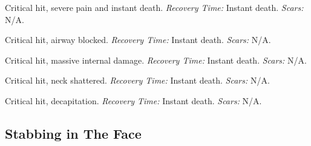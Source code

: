 \documentclass[12pt]{book}  %
\begin{document}
\begin{description}[labelwidth=1.5em, leftmargin=*, itemsep=0.4em]
    \item[16 -] Critical hit, severe pain and instant death. \textit{Recovery Time:} Instant death. \textit{Scars:} N/A.
    \item[17 -] Critical hit, airway blocked. \textit{Recovery Time:} Instant death. \textit{Scars:} N/A.
    \item[18 -] Critical hit, massive internal damage. \textit{Recovery Time:} Instant death. \textit{Scars:} N/A.
    \item[19 -] Critical hit, neck shattered. \textit{Recovery Time:} Instant death. \textit{Scars:} N/A.
    \item[20 -] Critical hit, decapitation. \textit{Recovery Time:} Instant death. \textit{Scars:} N/A.
\end{description}

\subsection{Stabbing in The Face}
\end{document}
